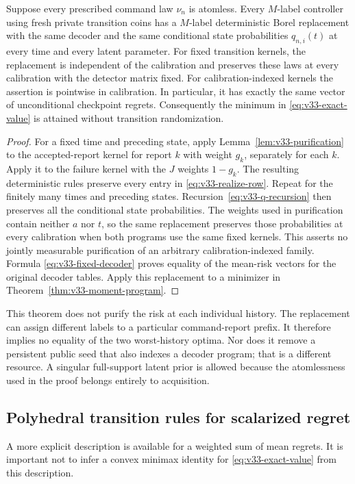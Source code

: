 \begin{theorem}
\label{thm:v33-pure}
Suppose every prescribed command law $\nu_n$ is atomless. Every
$M$-label controller using fresh private transition coins has a
$M$-label deterministic Borel replacement with the same decoder
and the same conditional state probabilities $q_{n,i}(t)$ at every
time and every latent parameter. For fixed transition kernels, the replacement is independent of the
calibration and preserves these laws at every calibration with the
detector matrix fixed. For calibration-indexed kernels the assertion
is pointwise in calibration. In particular,
it has exactly the same vector of unconditional checkpoint regrets.
Consequently the minimum in \eqref{eq:v33-exact-value} is attained
without transition randomization.
\end{theorem}
\begin{proof}
For a fixed time and preceding state, apply
Lemma~\ref{lem:v33-purification} to the accepted-report kernel for
report $k$ with weight $g_k$, separately for each $k$. Apply it to
the failure kernel with the $J$ weights $1-g_k$. The resulting
deterministic rules preserve every entry in
\eqref{eq:v33-realize-row}. Repeat for the finitely many times and
preceding states. Recursion~\eqref{eq:v33-q-recursion} then preserves
all the conditional state probabilities. The weights used in
purification contain neither $a$ nor $t$, so the same replacement
preserves those probabilities at every calibration when both programs
use the same fixed kernels. This asserts no jointly measurable
purification of an arbitrary calibration-indexed family. Formula
\eqref{eq:v33-fixed-decoder} proves equality of the mean-risk
vectors for the original decoder tables. Apply this replacement to
a minimizer in Theorem~\ref{thm:v33-moment-program}.
\end{proof}

This theorem does not purify the risk at each individual history. The
replacement can assign different labels to a particular command-report
prefix. It therefore implies no equality of the two worst-history
optima. Nor does it remove a persistent public seed that also indexes
a decoder program; that is a different resource. A singular full-support
latent prior is allowed because the atomlessness used in the proof
belongs entirely to acquisition.

\subsection{Polyhedral transition rules for scalarized regret}
A more explicit description is available for a weighted sum of mean
regrets. It is important not to infer a convex minimax identity for
\eqref{eq:v33-exact-value} from this description.

